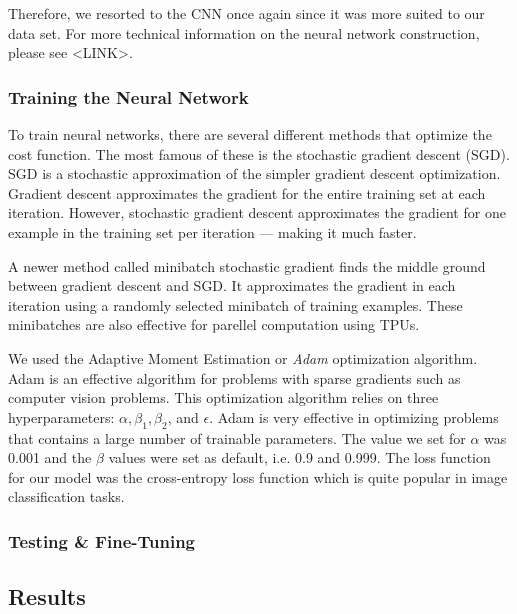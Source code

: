 \documentclass[11pt]{article}
\begin{document}
  Therefore, we resorted to the CNN once again since it was more suited to 
  our data set.
  For more technical information on the neural network construction, please see <LINK>.
  
  
  \subsubsection{Training the Neural Network}
  To train neural networks, there are several different methods that optimize 
  the cost function. The most famous of these is the stochastic gradient descent (SGD). 
  SGD is a stochastic approximation of the simpler gradient descent optimization. Gradient 
  descent approximates the gradient for the entire training set at each iteration. However, 
  stochastic gradient descent approximates the gradient for one example in the training set 
  per iteration --- making it much faster. 

  A newer method called minibatch stochastic gradient finds the middle ground between 
  gradient descent and SGD. It approximates the gradient in each iteration using a randomly 
  selected minibatch of training examples. These minibatches are also effective for 
  parellel computation using TPUs. 

  We used the Adaptive Moment Estimation or \textit{Adam} optimization algorithm. Adam is an 
  effective algorithm for problems with sparse gradients such as computer vision problems. 
  This optimization algorithm relies on three hyperparameters: $\alpha, \beta_1, \beta_2 $, and $\epsilon$.
  Adam is very effective in optimizing problems that contains a large number 
  of trainable parameters. The value we set for $\alpha$ was 0.001 and the $\beta$ values 
  were set as default, i.e. 0.9 and 0.999. The loss function for our model was 
  the cross-entropy loss function which is quite popular in image classification tasks.
   
  
  \subsubsection{Testing \& Fine-Tuning}

  \subsection{Results}
\newpage
\appendix
\end{document}
